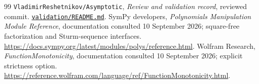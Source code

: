 \documentclass[11pt,letterpaper]{article}
\newcommand{\code}[1]{\nolinkurl{#1}}
\newcommand{\repo}{\texttt{VladimirReshetnikov/Asymptotic}}
\newcommand{\source}[2]{\href{https://github.com/VladimirReshetnikov/Asymptotic/blob/8e859961d7d37f008b826f3a8cad406460271614/#1}{#2}}
\begin{document}
\begin{thebibliography}{99}
 \repo, \emph{Review and validation record}, reviewed commit.\newline
\source{validation/README.md}{\code{validation/README.md}}.
 SymPy developers, \emph{Polynomials Manipulation Module Reference}, documentation consulted 10 September 2026; square-free factorization and Sturm-sequence interfaces.\newline
\url{https://docs.sympy.org/latest/modules/polys/reference.html}.
 Wolfram Research, \emph{FunctionMonotonicity}, documentation consulted 10 September 2026; explicit strictness option.\newline
\url{https://reference.wolfram.com/language/ref/FunctionMonotonicity.html}.
\end{thebibliography}
\end{document}
